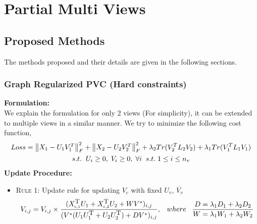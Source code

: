 \documentclass[a4paper]{article}
\begin{document}
	\tableofcontents

	\pagebreak	
	
	\section{Partial Multi Views}

	\subsection{Proposed Methods}
	
	The methods proposed and their details are given in the following sections.	
	
	\subsubsection{Graph Regularized PVC (Hard constraints)}
	
	\textbf{Formulation:}\\
	We explain the formulation for only 2 views (For simplicity), it can be extended to multiple views in a similar manner. We try to minimize the following cost function,
	\begin{multline}
	Loss = \begin{Vmatrix} X_{1}-U_{1}V^{T}_{1} \end{Vmatrix}^{2}_{F}	
		+ \begin{Vmatrix} X_{2}-U_{2}V^{T}_{2} \end{Vmatrix}^{2}_{F}
		+ \lambda_{2}Tr(V^{T}_{2}L_{2}V_{2}) + \lambda_{1}Tr(V^{T}_{1}L_{1}V_{1}) \\	
		s.t. \hspace{2mm}  U_{i}\geq0,\;V_{i}\geq0,\;\forall i \;\;s.t.\; 1 \leq i \leq n_{v}
	\end{multline}
	\noindent
	\textbf{Update Procedure:}
	\begin{itemize}
		\item \textsc{Rule 1:}	Update rule for updating $V_{c}$ with fixed $U_{v}$, $\overline{V_{v}}$
			\begin{multline}
			V_{i,j} = V_{i,j} \times \frac{(X_{\text{\tiny{c,1}}}^{\text{\small{T}}}U_{1}+X_{\text{\tiny{c,2}}}^{\text{\small{T}}}U_{2}+WV^{*})_{i,j}}{(V^{*}(U_{1}U_{1}^{\text{\small{T}}}+U_{2}U_{2}^{\text{\small{T}}})+DV^{*})_{i,j}}, \;\;\; where	\;\;\;
			\frac{D=\lambda_{1}D_{1}+\lambda_{2}D_{2}}{W=\lambda_{1}W_{1}+\lambda_{2}W_{2}}\\		
			\end{multline}
	\end{itemize}		
	
\end{document}
